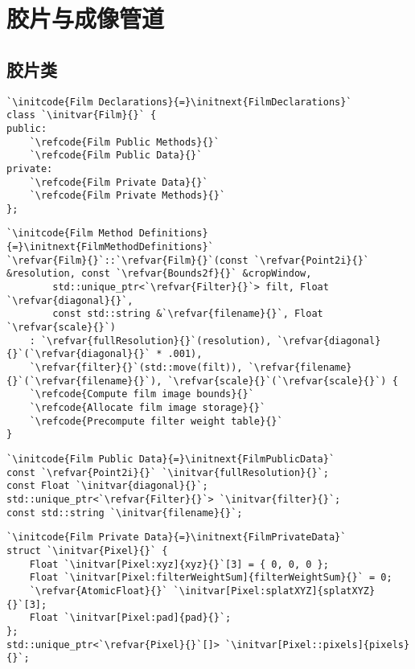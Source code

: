 \section{胶片与成像管道}\label{sec:胶片与成像管道}

\subsection{胶片类}\label{sub:胶片类}

\begin{lstlisting}
`\initcode{Film Declarations}{=}\initnext{FilmDeclarations}`
class `\initvar{Film}{}` {
public:
    `\refcode{Film Public Methods}{}`
    `\refcode{Film Public Data}{}`
private:
    `\refcode{Film Private Data}{}`
    `\refcode{Film Private Methods}{}`
};
\end{lstlisting}

\begin{lstlisting}
`\initcode{Film Method Definitions}{=}\initnext{FilmMethodDefinitions}`
`\refvar{Film}{}`::`\refvar{Film}{}`(const `\refvar{Point2i}{}` &resolution, const `\refvar{Bounds2f}{}` &cropWindow,
        std::unique_ptr<`\refvar{Filter}{}`> filt, Float `\refvar{diagonal}{}`,
        const std::string &`\refvar{filename}{}`, Float `\refvar{scale}{}`)
    : `\refvar{fullResolution}{}`(resolution), `\refvar{diagonal}{}`(`\refvar{diagonal}{}` * .001),
    `\refvar{filter}{}`(std::move(filt)), `\refvar{filename}{}`(`\refvar{filename}{}`), `\refvar{scale}{}`(`\refvar{scale}{}`) {
    `\refcode{Compute film image bounds}{}`
    `\refcode{Allocate film image storage}{}`
    `\refcode{Precompute filter weight table}{}`
}
\end{lstlisting}

\begin{lstlisting}
`\initcode{Film Public Data}{=}\initnext{FilmPublicData}`
const `\refvar{Point2i}{}` `\initvar{fullResolution}{}`;
const Float `\initvar{diagonal}{}`;
std::unique_ptr<`\refvar{Filter}{}`> `\initvar{filter}{}`;
const std::string `\initvar{filename}{}`;
\end{lstlisting}

\begin{lstlisting}
`\initcode{Film Private Data}{=}\initnext{FilmPrivateData}`
struct `\initvar{Pixel}{}` {
    Float `\initvar[Pixel:xyz]{xyz}{}`[3] = { 0, 0, 0 };
    Float `\initvar[Pixel:filterWeightSum]{filterWeightSum}{}` = 0;
    `\refvar{AtomicFloat}{}` `\initvar[Pixel:splatXYZ]{splatXYZ}{}`[3];
    Float `\initvar[Pixel:pad]{pad}{}`;
};
std::unique_ptr<`\refvar{Pixel}{}`[]> `\initvar[Pixel::pixels]{pixels}{}`;
\end{lstlisting}

